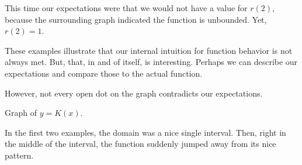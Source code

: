 \documentclass{ximera}
\begin{document}
This time our expectations were that we would not have a value for $r(2)$, because the surrounding graph indicated the function is unbounded.  Yet, $r(2) = 1$.



















These examples illustrate that our internal intuition for function behavior is not always met.  But, that, in and of itself, is interesting.  Perhaps we can describe our expectations and compare those to the actual function.







However, not every open dot on the graph contradicts our expectations.






Graph of $y = K(x)$.

\begin{image}
\end{image}



In the first two examples, the domain was a nice single interval.  Then, right in the middle of the interval, the function suddenly jumped away from its nice pattern. \\
\end{document}
